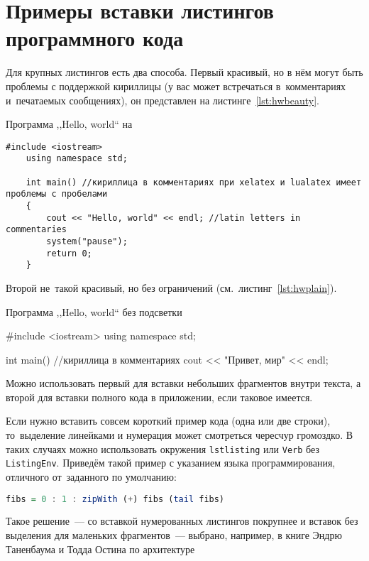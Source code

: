 \chapter{Примеры вставки листингов программного кода}\label{app:A}

Для крупных листингов есть два способа. Первый красивый, но в нём могут быть
проблемы с поддержкой кириллицы (у вас может встречаться в~комментариях
и~печатаемых сообщениях), он представлен на листинге~\ref{lst:hwbeauty}.
\begin{ListingEnv}[!h]%
    \captiondelim{ } %
    \caption{Программа ,,Hello, world`` на \protect\cpp}\label{lst:hwbeauty}
    \begin{lstlisting}[language={[ISO]C++}]
	#include <iostream>
	using namespace std;

	int main() //кириллица в комментариях при xelatex и lualatex имеет проблемы с пробелами
	{
		cout << "Hello, world" << endl; //latin letters in commentaries
		system("pause");
		return 0;
	}
    \end{lstlisting}
\end{ListingEnv}%
Второй не~такой красивый, но без ограничений (см.~листинг~\ref{lst:hwplain}).
\begin{ListingEnv}[!h]
    \captiondelim{ } %
    \caption{Программа ,,Hello, world`` без подсветки}\label{lst:hwplain}
    \begin{Verb}

        #include <iostream>
        using namespace std;

        int main() //кириллица в комментариях
        {
            cout << "Привет, мир" << endl;
        }
    \end{Verb}
\end{ListingEnv}

Можно использовать первый для вставки небольших фрагментов
внутри текста, а второй для вставки полного
кода в приложении, если таковое имеется.

Если нужно вставить совсем короткий пример кода (одна или две строки),
то~выделение  линейками и нумерация может смотреться чересчур громоздко.
В таких случаях можно использовать окружения \texttt{lstlisting} или
\texttt{Verb} без \texttt{ListingEnv}. Приведём такой пример
с указанием языка программирования, отличного от~заданного по умолчанию:
\begin{lstlisting}[language=Haskell]
fibs = 0 : 1 : zipWith (+) fibs (tail fibs)
\end{lstlisting}
Такое решение~--- со вставкой нумерованных листингов покрупнее
и вставок без выделения для маленьких фрагментов~--- выбрано,
например, в книге Эндрю Таненбаума и Тодда Остина по архитектуре

